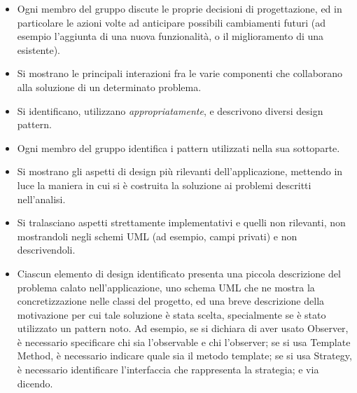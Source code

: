\documentclass[a4paper,12pt]{report}
\begin{document}
	\begin{itemize}
		\item Ogni membro del gruppo discute le proprie decisioni di progettazione, ed in particolare le azioni volte ad anticipare possibili cambiamenti futuri (ad esempio l'aggiunta di una nuova funzionalità, o il miglioramento di una esistente).
		\item Si mostrano le principali interazioni fra le varie componenti che collaborano alla soluzione di un determinato problema.
		\item Si identificano, utilizzano \textit{appropriatamente}, e descrivono diversi design pattern.
		\item Ogni membro del gruppo identifica i pattern utilizzati nella sua sottoparte.
		\item Si mostrano gli aspetti di design più rilevanti dell'applicazione, mettendo in luce la maniera in cui si è costruita la soluzione ai problemi descritti nell'analisi.
		\item Si tralasciano aspetti strettamente implementativi e quelli non rilevanti, non mostrandoli negli schemi UML (ad esempio, campi privati) e non descrivendoli.
		\item Ciascun elemento di design identificato presenta una piccola descrizione del problema calato
		nell'applicazione, uno schema UML che ne mostra la concretizzazione nelle classi del progetto, ed
		una breve descrizione della motivazione per cui tale soluzione è stata scelta, specialmente se è stato utilizzato un pattern noto. Ad esempio, se si
		dichiara di aver usato Observer, è necessario specificare chi sia l'observable e chi l'observer; se
		si usa Template Method, è necessario indicare quale sia il metodo template; se si usa Strategy, è
		necessario identificare l'interfaccia che rappresenta la strategia; e via dicendo.
	\end{itemize}
	
\end{document}

